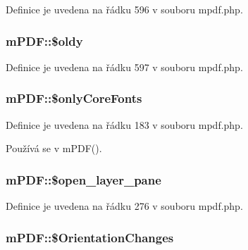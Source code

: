 Definice je uvedena na řádku 596 v souboru mpdf.\-php.

\hypertarget{classm_p_d_f_a95fa1ff9d4a3711e22cad03d60c06d39}{
\subsubsection[{\$oldy}]{\setlength{\rightskip}{0pt plus 5cm}m\-P\-D\-F\-::\$oldy}}\label{classm_p_d_f_a95fa1ff9d4a3711e22cad03d60c06d39}


Definice je uvedena na řádku 597 v souboru mpdf.\-php.

\hypertarget{classm_p_d_f_a63b19fe6a1a3fe28f1213d5671399e55}{
\subsubsection[{\$only\-Core\-Fonts}]{\setlength{\rightskip}{0pt plus 5cm}m\-P\-D\-F\-::\$only\-Core\-Fonts}}\label{classm_p_d_f_a63b19fe6a1a3fe28f1213d5671399e55}


Definice je uvedena na řádku 183 v souboru mpdf.\-php.



Používá se v m\-P\-D\-F().

\hypertarget{classm_p_d_f_a769092bae33b765db1403b25ef591695}{
\subsubsection[{\$open\-\_\-layer\-\_\-pane}]{\setlength{\rightskip}{0pt plus 5cm}m\-P\-D\-F\-::\$open\-\_\-layer\-\_\-pane}}\label{classm_p_d_f_a769092bae33b765db1403b25ef591695}


Definice je uvedena na řádku 276 v souboru mpdf.\-php.

\hypertarget{classm_p_d_f_a2406f25f327838ac43f73c83ac345157}{
\subsubsection[{\$\-Orientation\-Changes}]{\setlength{\rightskip}{0pt plus 5cm}m\-P\-D\-F\-::\$\-Orientation\-Changes}}\label{classm_p_d_f_a2406f25f327838ac43f73c83ac345157}


